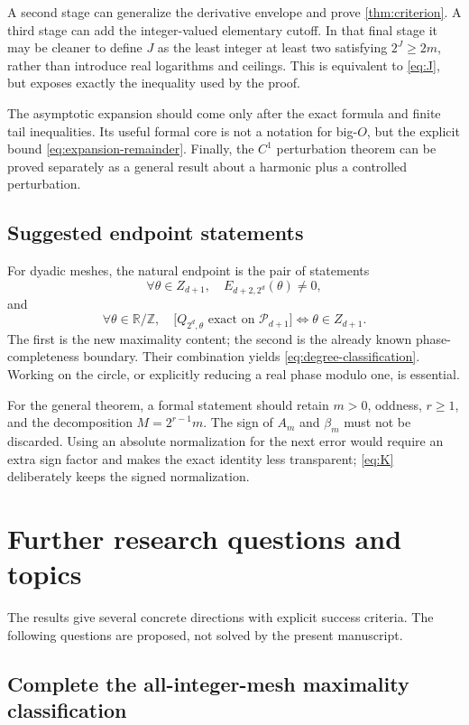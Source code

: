 \documentclass[11pt,a4paper]{article}
\numberwithin{equation}{section}
\theoremstyle{plain}
\theoremstyle{definition}
\theoremstyle{remark}
\newcommand{\T}{\mathbb R/\mathbb Z}
\newcommand{\Poly}{\mathcal P}
\begin{document}
A second stage can generalize the derivative envelope and prove
\cref{thm:criterion}. A third stage can add the integer-valued elementary
cutoff. In that final stage it may be cleaner to define $J$ as the least
integer at least two satisfying $2^J\ge2m$, rather than introduce real
logarithms and ceilings. This is equivalent to \eqref{eq:J}, but exposes
exactly the inequality used by the proof.

The asymptotic expansion should come only after the exact formula and
finite tail inequalities. Its useful formal core is not a notation for
big-$O$, but the explicit bound \eqref{eq:expansion-remainder}. Finally,
the $C^1$ perturbation theorem can be proved separately as a general result
about a harmonic plus a controlled perturbation.

\subsection{Suggested endpoint statements}

For dyadic meshes, the natural endpoint is the pair of statements
\[
 \forall\theta\in Z_{d+1},\quad E_{d+2,2^d}(\theta)\ne0,
\]
and
\[
 \forall\theta\in\T,\quad
 \bigl[Q_{2^d,\theta}\text{ exact on }\Poly_{d+1}\bigr]
 \Longleftrightarrow\theta\in Z_{d+1}.
\]
The first is the new maximality content; the second is the already known
phase-completeness boundary. Their combination yields
\eqref{eq:degree-classification}. Working on the circle, or explicitly
reducing a real phase modulo one, is essential.

For the general theorem, a formal statement should retain $m>0$, oddness,
$r\ge1$, and the decomposition $M=2^{r-1}m$. The sign of $A_m$ and
$\beta_m$ must not be discarded. Using an absolute normalization for the
next error would require an extra sign factor and makes the exact identity
less transparent; \eqref{eq:K} deliberately keeps the signed normalization.

\section{Further research questions and topics}
\label{sec:research}

The results give several concrete directions with explicit success
criteria. The following questions are proposed, not solved by the present
manuscript.

\subsection{Complete the all-integer-mesh maximality classification}
\end{document}
